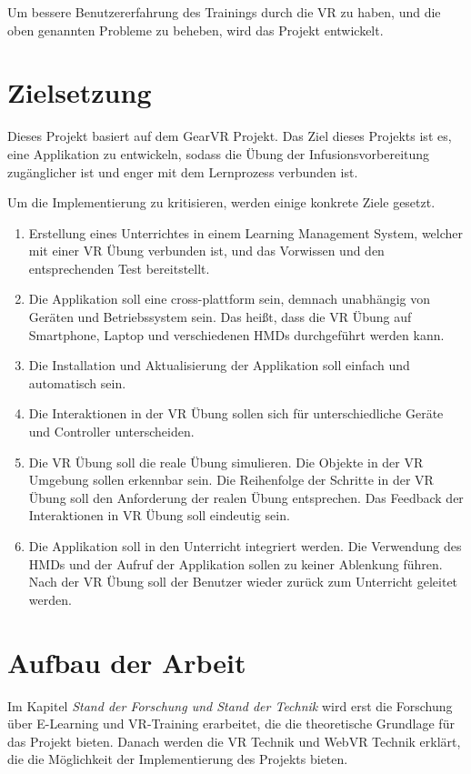 Um bessere Benutzererfahrung des Trainings durch die VR zu haben, und die oben genannten Probleme zu beheben, wird das Projekt entwickelt.

\section{Zielsetzung}

Dieses Projekt basiert auf dem GearVR Projekt. Das Ziel dieses Projekts ist es, eine Applikation zu entwickeln, sodass die Übung der Infusionsvorbereitung zugänglicher ist und enger mit dem Lernprozess verbunden ist.

Um die Implementierung zu kritisieren, werden einige konkrete Ziele gesetzt.

\begin{enumerate}[labelsep=1ex]
	\renewcommand{\labelenumi}{\textbf{Z\theenumi.}}
	\item Erstellung eines Unterrichtes in einem Learning Management System, welcher mit einer VR Übung verbunden ist, und das Vorwissen und den entsprechenden Test bereitstellt.
	
	\item Die Applikation soll eine cross-plattform sein, demnach unabhängig von Geräten und Betriebssystem sein. Das heißt, dass die VR Übung auf Smartphone, Laptop und verschiedenen HMDs durchgeführt werden kann.
	
	\item Die Installation und Aktualisierung der Applikation soll einfach und automatisch sein.
	
	\item Die Interaktionen in der VR Übung sollen sich für unterschiedliche Geräte und Controller unterscheiden.
	
	\item Die VR Übung soll die reale Übung simulieren. Die Objekte in der VR Umgebung sollen erkennbar sein. Die Reihenfolge der Schritte in der VR Übung soll den Anforderung der realen Übung entsprechen. Das Feedback der Interaktionen in VR Übung soll eindeutig sein.
	
	\item Die Applikation soll in den Unterricht integriert werden. Die Verwendung des HMDs und der Aufruf der Applikation sollen zu keiner Ablenkung führen. Nach der VR Übung soll der Benutzer wieder zurück zum Unterricht geleitet werden.
	
\end{enumerate}

\section{Aufbau der Arbeit}
Im Kapitel {\em Stand der Forschung und Stand der Technik} wird erst die Forschung über E-Learning und VR-Training erarbeitet, die die theoretische Grundlage für das Projekt bieten. Danach werden die VR Technik und WebVR Technik erklärt, die die Möglichkeit der Implementierung des Projekts bieten.

